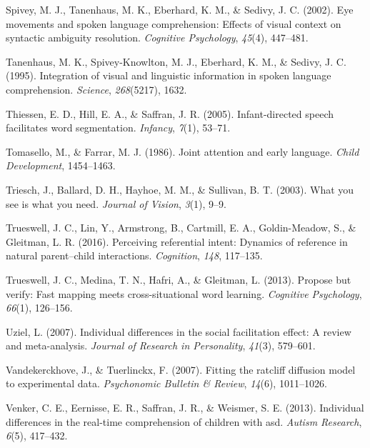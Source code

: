 \documentclass[oneside]{report}
\begin{document}
\hypertarget{ref-spivey2002eye}{}
Spivey, M. J., Tanenhaus, M. K., Eberhard, K. M., \& Sedivy, J. C.
(2002). Eye movements and spoken language comprehension: Effects of
visual context on syntactic ambiguity resolution. \emph{Cognitive
Psychology}, \emph{45}(4), 447--481.

\hypertarget{ref-tanenhaus1995integration}{}
Tanenhaus, M. K., Spivey-Knowlton, M. J., Eberhard, K. M., \& Sedivy, J.
C. (1995). Integration of visual and linguistic information in spoken
language comprehension. \emph{Science}, \emph{268}(5217), 1632.

\hypertarget{ref-thiessen2005infant}{}
Thiessen, E. D., Hill, E. A., \& Saffran, J. R. (2005). Infant-directed
speech facilitates word segmentation. \emph{Infancy}, \emph{7}(1),
53--71.

\hypertarget{ref-tomasello1986joint}{}
Tomasello, M., \& Farrar, M. J. (1986). Joint attention and early
language. \emph{Child Development}, 1454--1463.

\hypertarget{ref-triesch2003you}{}
Triesch, J., Ballard, D. H., Hayhoe, M. M., \& Sullivan, B. T. (2003).
What you see is what you need. \emph{Journal of Vision}, \emph{3}(1),
9--9.

\hypertarget{ref-trueswell2016perceiving}{}
Trueswell, J. C., Lin, Y., Armstrong, B., Cartmill, E. A.,
Goldin-Meadow, S., \& Gleitman, L. R. (2016). Perceiving referential
intent: Dynamics of reference in natural parent--child interactions.
\emph{Cognition}, \emph{148}, 117--135.

\hypertarget{ref-trueswell2013propose}{}
Trueswell, J. C., Medina, T. N., Hafri, A., \& Gleitman, L. (2013).
Propose but verify: Fast mapping meets cross-situational word learning.
\emph{Cognitive Psychology}, \emph{66}(1), 126--156.

\hypertarget{ref-uziel2007individual}{}
Uziel, L. (2007). Individual differences in the social facilitation
effect: A review and meta-analysis. \emph{Journal of Research in
Personality}, \emph{41}(3), 579--601.

\hypertarget{ref-vandekerckhove2007fitting}{}
Vandekerckhove, J., \& Tuerlinckx, F. (2007). Fitting the ratcliff
diffusion model to experimental data. \emph{Psychonomic Bulletin \&
Review}, \emph{14}(6), 1011--1026.

\hypertarget{ref-venker2013individual}{}
Venker, C. E., Eernisse, E. R., Saffran, J. R., \& Weismer, S. E.
(2013). Individual differences in the real-time comprehension of
children with asd. \emph{Autism Research}, \emph{6}(5), 417--432.
\end{document}
